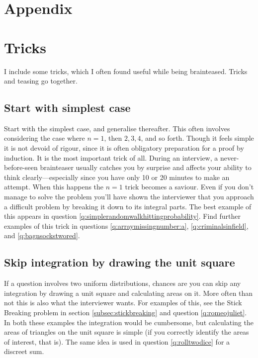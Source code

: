 \documentclass[a4paper]{article}
\begin{document}
\clearpage
\appendix

{}
\section*{Appendix}


\section{Tricks}
\label{ap:tricks}
I include some tricks, which I often found useful while being brainteased.
Tricks and teasing go together.

\subsection{Start with simplest case}
Start with the simplest case, and generalise thereafter.
This often involves considering the case where $n=1$, then $2,3,4$, and so forth.
Though it feels simple it is not devoid of rigour, since it is often obligatory preparation for a proof by induction.
It is the most important trick of all.
During an interview, a never-before-seen brainteaser usually catches you by surprise and affects your ability to think clearly---especially since you have only 10 or 20 minutes to make an attempt.
When this happens the $n=1$ trick becomes a saviour.
Even if you don't manage to solve the problem you'll have shown the interviewer that you approach a difficult problem by breaking it down to its integral parts.
The best example of this appears in question
\ref{q:simplerandomwalkhittingprobability}.
Find further examples of this trick in questions
\ref{q:arraymissingnumber:a},
\ref{q:criminalsinfield},
and
\ref{q:bagnsockstwored}.

\subsection{Skip integration by drawing the unit square}
If a question involves two uniform distributions, chances are you can skip any integration by drawing a unit square and calculating areas on it.
More often than not this is also what the interviewer wants.
For examples of this, see the Stick Breaking problem in section \ref{subsec:stickbreaking} and question \ref{q:romeojuliet}.
In both these examples the integration would be cumbersome, but calculating the areas of triangles on the unit square is simple (if you correctly identify the areas of interest, that is).
The same idea is used in question \ref{q:rolltwodice} for a discreet sum.
\end{document}
